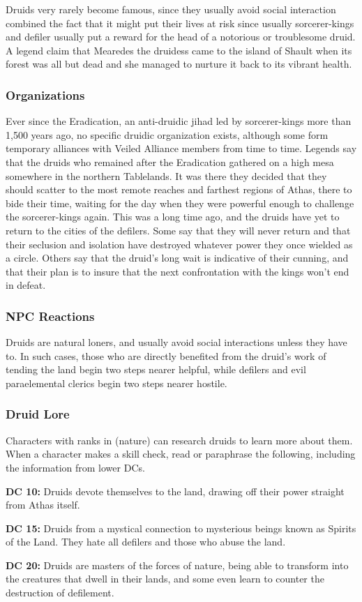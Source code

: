Druids very rarely become famous, since they usually avoid social interaction combined the fact that it might put their lives at risk since usually sorcerer-kings and defiler usually put a reward for the head of a notorious or troublesome druid. A legend claim that Mearedes the druidess came to the island of Shault when its forest was all but dead and she managed to nurture it back to its vibrant health.

\subsubsection{Organizations}

Ever since the Eradication, an anti-druidic jihad led by sorcerer-kings more than 1,500 years ago, no specific druidic organization exists, although some form temporary alliances with Veiled Alliance members from time to time. Legends say that the druids who remained after the Eradication gathered on a high mesa somewhere in the northern Tablelands. It was there they decided that they should scatter to the most remote reaches and farthest regions of Athas, there to bide their time, waiting for the day when they were powerful enough to challenge the sorcerer-kings again. This was a long time ago, and the druids have yet to return to the cities of the defilers. Some say that they will never return and that their seclusion and isolation have destroyed whatever power they once wielded as a circle. Others say that the druid's long wait is indicative of their cunning, and that their plan is to insure that the next confrontation with the kings won't end in defeat.

\subsubsection{NPC Reactions}

Druids are natural loners, and usually avoid social interactions unless they have to. In such cases, those who are directly benefited from the druid's work of tending the land begin two steps nearer helpful, while defilers and evil paraelemental clerics begin two steps nearer hostile.

\subsubsection{Druid Lore}

Characters with ranks in  (nature) can research druids to learn more about them. When a character makes a skill check, read or paraphrase the following, including the information from lower DCs.

\textbf{DC 10:} Druids devote themselves to the land, drawing off their power straight from Athas itself.

\textbf{DC 15:} Druids from a mystical connection to mysterious beings known as Spirits of the Land. They hate all defilers and those who abuse the land.

\textbf{DC 20:} Druids are masters of the forces of nature, being able to transform into the creatures that dwell in their lands, and some even learn to counter the destruction of defilement.
